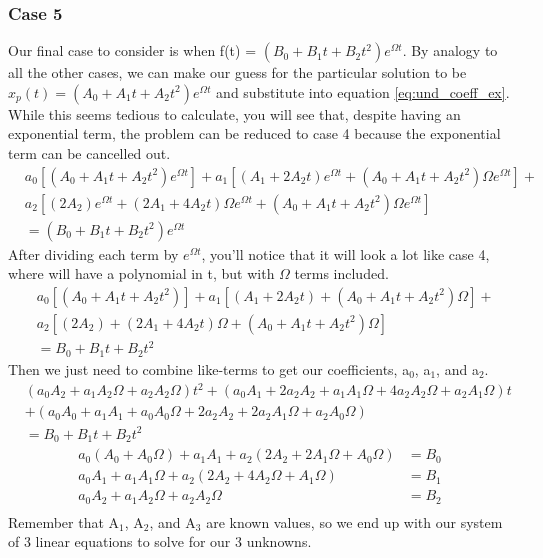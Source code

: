 \documentclass{article}
\newcommand{\be}{\begin{equation}}
\newcommand{\ee}{\end{equation}}
\begin{document}
\subsubsection*{Case 5}
Our final case to consider is when f(t) = $(B_0 + B_1t + B_2t^2) e^{\Omega t}$.
By analogy to all the other cases, we can make our guess for the particular solution to be $x_p(t) = (A_0 + A_1 t + A_2 t^2) e^{\Omega t}$ and substitute into equation \ref{eq:und_coeff_ex}.
While this seems tedious to calculate, you will see that, despite having an exponential term, the problem can be reduced to case 4 because the exponential term can be cancelled out.
\be
\begin{split}
& a_0[ (A_0 + A_1 t + A_2 t^2) e^{\Omega t} ] + a_1[ (A_1 + 2 A_2 t) e^{\Omega t} + (A_0 + A_1 t + A_2 t^2) \Omega e^{\Omega t} ] + \\
& a_2[ (2 A_2) e^{\Omega t} + (2 A_1 + 4 A_2 t) \Omega e^{\Omega t} + (A_0 + A_1 t + A_2 t^2) \Omega e^{\Omega t}] \\
&= (B_0 + B_1t + B_2t^2) e^{\Omega t}
\end{split}
\ee
After dividing each term by $e^{\Omega t}$, you'll notice that it will look a lot like case 4, where will have a polynomial in t, but with $\Omega$ terms included.
\be
\begin{split}
& a_0[ (A_0 + A_1 t + A_2 t^2) ] + a_1[ (A_1 + 2 A_2 t) + (A_0 + A_1 t + A_2 t^2) \Omega ] + \\
& a_2[ (2 A_2) + (2 A_1 + 4 A_2 t) \Omega + (A_0 + A_1 t + A_2 t^2) \Omega] \\
&= B_0 + B_1t + B_2t^2
\end{split}
\ee
Then we just need to combine like-terms to get our coefficients, a$_0$, a$_1$, and a$_2$.
\be
\begin{split}
&(a_0 A_2 + a_1 A_2 \Omega + a_2 A_2 \Omega) t^2 + (a_0 A_1 + 2a_2 A_2 + a_1 A_1 \Omega + 4a_2 A_2 \Omega + a_2 A_1 \Omega) t \\
& + (a_0 A_0 + a_1 A_1 + a_0 A_0 \Omega + 2a_2 A_2 + 2a_2 A_1 \Omega + a_2 A_0 \Omega) \\
&= B_0 + B_1t + B_2t^2
\end{split}
\ee
\be
\begin{split}
    a_0(A_0 + A_0 \Omega) + a_1 A_1 + a_2(2 A_2 + 2 A_1 \Omega + A_0 \Omega) &= B_0 \\
    a_0 A_1 + a_1 A_1 \Omega + a_2(2 A_2 + 4 A_2 \Omega + A_1 \Omega) &= B_1 \\
    a_0 A_2 + a_1 A_2 \Omega + a_2 A_2 \Omega &= B_2 \\
\end{split}
\ee
Remember that A$_1$, A$_2$, and A$_3$ are known values, so we end up with our system of 3 linear equations to solve for our 3 unknowns.
\end{document}
